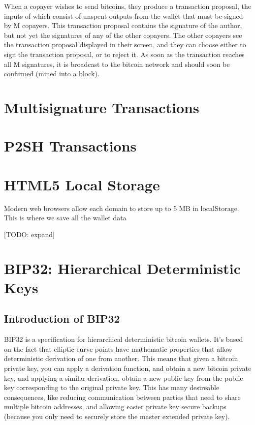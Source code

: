 \documentclass{article}
\begin{document}
When a copayer wishes to send bitcoins, they produce a transaction proposal, the inputs of which consist of unspent outputs from the wallet that must be signed by M copayers.
This transaction proposal contains the signature of the author, but not yet the signatures of any of the other copayers.
The other copayers see the transaction proposal displayed in their screen, and they can choose either to sign the transaction proposal, or to reject it.
As soon as the transaction reaches all M signatures, it is broadcast to the bitcoin network and should soon be confirmed (mined into a block).

\section{Multisignature Transactions}

\section{P2SH Transactions}

\section{HTML5 Local Storage}

Modern web browsers allow each domain to store up to 5 MB in localStorage. This is where we save all the wallet data

[TODO: expand]

\section{BIP32: Hierarchical Deterministic Keys}

\subsection{Introduction of BIP32}

BIP32 \cite{bip32} is a specification for hierarchical deterministic bitcoin wallets.
It's based on the fact that elliptic curve points have mathematic properties that allow deterministic derivation of one from another.
This means that given a bitcoin private key, you can apply a derivation function, and obtain a new bitcoin private key, and applying a similar derivation, obtain a new public key from the public key corresponding to the original private key.
This has many desireable consequences, like reducing communication between parties that need to share multiple bitcoin addresses, and allowing easier private key secure backups (because you only need to securely store the master extended private key). 
\end{document}
